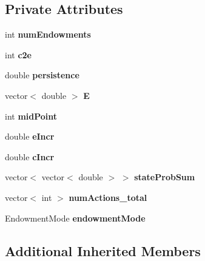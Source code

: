 \subsection*{Private Attributes}
\begin{DoxyCompactItemize}
\item 
\mbox{\label{classRiskSharingGame_a8236f900f444fa81985d42364f5052d5}} 
int {\bfseries num\+Endowments}
\item 
\mbox{\label{classRiskSharingGame_abbc092fe82572dd91278124713ecdce6}} 
int {\bfseries c2e}
\item 
\mbox{\label{classRiskSharingGame_a0bb2edd8646a536d2e70b960c2a27ffa}} 
double {\bfseries persistence}
\item 
\mbox{\label{classRiskSharingGame_a2aefe50f2cac37e7226f490303f6ecdb}} 
vector$<$ double $>$ {\bfseries E}
\item 
\mbox{\label{classRiskSharingGame_a667851c4a7814e141164953615253960}} 
int {\bfseries mid\+Point}
\item 
\mbox{\label{classRiskSharingGame_a2461185db47c09248dff9ba24096aa04}} 
double {\bfseries e\+Incr}
\item 
\mbox{\label{classRiskSharingGame_a494738415dfc21e87c7de3e79c0ab852}} 
double {\bfseries c\+Incr}
\item 
\mbox{\label{classRiskSharingGame_a710c6947fefecf2d3018c4bc07a50cf6}} 
vector$<$ vector$<$ double $>$ $>$ {\bfseries state\+Prob\+Sum}
\item 
\mbox{\label{classRiskSharingGame_a8891d49871f4f19cab0fc2e7beb14345}} 
vector$<$ int $>$ {\bfseries num\+Actions\+\_\+total}
\item 
\mbox{\label{classRiskSharingGame_a82b03b56b74462d424fd7dedf8870dc9}} 
Endowment\+Mode {\bfseries endowment\+Mode}
\end{DoxyCompactItemize}
\subsection*{Additional Inherited Members}


